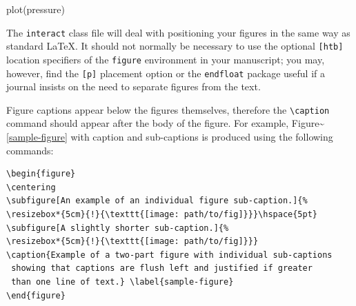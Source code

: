 \documentclass[]{interact}
\theoremstyle{plain}%
\theoremstyle{definition}
\theoremstyle{remark}
\newenvironment{Shaded}{\begin{snugshade}}{\end{snugshade}}
\newcommand{\FunctionTok}[1]{\textcolor[rgb]{0.00,0.00,0.00}{#1}}
\newcommand{\NormalTok}[1]{#1}
\begin{document}
\begin{Shaded}
\begin{Highlighting}[]
\FunctionTok{plot}\NormalTok{(pressure)}
\end{Highlighting}
\end{Shaded}

The \texttt{interact} class file will deal with positioning your figures
in the same way as standard \LaTeX. It should not normally be necessary
to use the optional \texttt{{[}htb{]}} location specifiers of the
\texttt{figure} environment in your manuscript; you may, however, find
the \texttt{{[}p{]}} placement option or the \texttt{endfloat} package
useful if a journal insists on the need to separate figures from the
text.

Figure captions appear below the figures themselves, therefore the
\texttt{\textbackslash{}caption} command should appear after the body of
the figure. For example, Figure\textasciitilde{}\ref{sample-figure} with
caption and sub-captions is produced using the following commands:

\begin{verbatim}
\begin{figure}
\centering
\subfigure[An example of an individual figure sub-caption.]{%
\resizebox*{5cm}{!}{\texttt{[image: path/to/fig]}}}\hspace{5pt}
\subfigure[A slightly shorter sub-caption.]{%
\resizebox*{5cm}{!}{\texttt{[image: path/to/fig]}}}
\caption{Example of a two-part figure with individual sub-captions
 showing that captions are flush left and justified if greater
 than one line of text.} \label{sample-figure}
\end{figure}
\end{verbatim}
\end{document}
